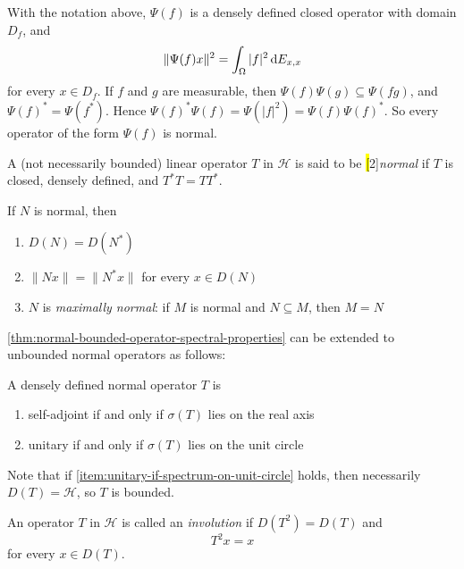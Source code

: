 \begin{theorem}%
With the notation above, $\Psi(f)$ is a densely defined closed operator with domain $D_f$, and
\[
\|\Psi(f)x\|^2 = \int_\Omega |f|^2\, \mathrm{d} E_{x,x}
\]
for every $x \in D_f$.
If $f$ and $g$ are measurable, then
\(
\Psi(f)\Psi(g) \subseteq \Psi(fg)
\),
and
\(
\Psi(f)^* = \Psi(f^*)
\).
Hence
\(
\Psi(f)^*\Psi(f)=\Psi(|f|^2)=\Psi(f)\Psi(f)^*
\).
So every operator of the form $\Psi(f)$ is normal.
\end{theorem}


\begin{definition}\label{def:normal-operator}
A (not necessarily bounded) linear operator $T$ in $\mathcal{H}$ is said to be \hl[2]{\emph{normal}} if $T$ is closed, densely defined, and $T^* T = T T^*$.
\end{definition}

\begin{theorem}
If $N$ is normal, then
\begin{enumerate}[label=(\alph*)]
\item $D(N)=D(N^*)$
\item $\|Nx\|=\|N^*x\|$ for every $x\in D(N)$
\item $N$ is \emph{maximally normal}: if $M$ is normal and $N\subseteq M$, then $M=N$
\qedhere
\end{enumerate}
\end{theorem}




\autoref{thm:normal-bounded-operator-spectral-properties} can be extended to unbounded normal operators as follows:


\begin{theorem}
A densely defined normal operator $T$ is 
\begin{enumerate}[label=(\alph*)]
\item self-adjoint if and only if $\sigma(T)$ lies on the real axis
\item unitary if and only if $\sigma(T)$ lies on the unit circle \label{item:unitary-if-spectrum-on-unit-circle}
\end{enumerate}
Note that if \ref{item:unitary-if-spectrum-on-unit-circle} holds, then necessarily $D(T)=\mathcal H$, so $T$ is bounded.
\end{theorem}

\begin{definition}\label{def:involution-unbounded}
An operator $T$ in $\mathcal H$ is called an \emph{involution} if
$D(T^2)=D(T)$
and
\[T^2x=x\]
for every $x\in D(T)$.
\end{definition}

